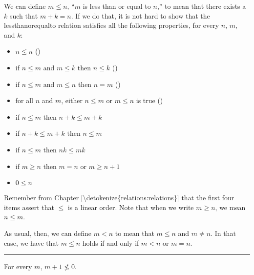 \documentclass[letterpaper,10pt,english]{sphinxmanual}
\begin{document}
\sphinxAtStartPar
We can define \(m \le n\), “\(m\) is less than or equal to \(n\),” to mean that there exists a \(k\) such that \(m + k = n\). If we do that, it is not hard to show that the less\sphinxhyphen{}than\sphinxhyphen{}or\sphinxhyphen{}equal\sphinxhyphen{}to relation satisfies all the following properties, for every \(n\), \(m\), and \(k\):
\begin{itemize}
\item {} 
\sphinxAtStartPar
\(n \le n\) ()

\item {} 
\sphinxAtStartPar
if \(n \le m\) and \(m \le k\) then \(n \le k\) ()

\item {} 
\sphinxAtStartPar
if \(n \le m\) and \(m \le n\) then \(n = m\) ()

\item {} 
\sphinxAtStartPar
for all \(n\) and \(m\), either \(n \le m\) or \(m \le n\) is true ()

\item {} 
\sphinxAtStartPar
if \(n \le m\) then \(n + k \le m + k\)

\item {} 
\sphinxAtStartPar
if \(n + k \le m + k\) then \(n \le m\)

\item {} 
\sphinxAtStartPar
if \(n \le m\) then \(nk \le mk\)

\item {} 
\sphinxAtStartPar
if \(m \ge n\) then \(m = n\) or \(m \ge n + 1\)

\item {} 
\sphinxAtStartPar
\(0 \le n\)

\end{itemize}

\sphinxAtStartPar
Remember from \hyperref[\detokenize{relations:relations}]{Chapter \ref{\detokenize{relations:relations}}} that the first four items assert that \(\le\) is a linear order. Note that when we write \(m \ge n\), we mean \(n \le m\).

\sphinxAtStartPar
As usual, then, we can define \(m < n\) to mean that \(m \le n\) and \(m \ne n\). In that case, we have that \(m \le n\) holds if and only if \(m < n\) or \(m = n\).


\bigskip\hrule\bigskip


\sphinxAtStartPar
{} For every \(m\), \(m + 1 \not\le 0\).
\end{document}
